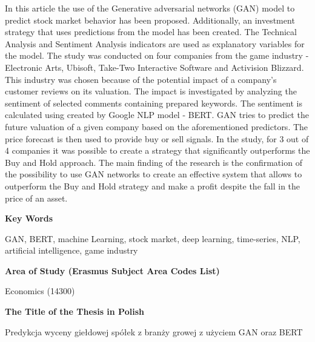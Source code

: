 \documentclass[11pt]{article} %
\begin{document}
\noindent In this article the use of the Generative adversarial networks (GAN) model to predict stock market behavior has been proposed. Additionally, an investment strategy that uses predictions from the model has been created. The Technical Analysis and Sentiment Analysis indicators are used as explanatory variables for the model. The study was conducted on four companies from the game industry -  Electronic Arts, Ubisoft, Take-Two Interactive Software and Activision Blizzard.  This industry was chosen because of the potential impact of a company's customer reviews on its valuation. The impact is investigated by analyzing the sentiment of selected comments containing prepared keywords. The sentiment is calculated using created by Google NLP model - BERT. GAN tries to predict the future valuation of a given company based on the aforementioned predictors. The price forecast is then used to provide buy or sell signals. In the study, for 3 out of 4 companies it was possible to create a strategy that significantly outperforms the Buy and Hold approach. The main finding of the research is the confirmation of the possibility to use GAN networks to create an effective system that allows to outperform the Buy and Hold strategy and make a profit despite the fall in the price of an asset.

\vspace{\baselineskip}

\begin{center}
\textbf{Key Words}

GAN, BERT, machine Learning, stock market, deep learning, time-series, NLP, artificial intelligence, game industry
\end{center}

\vspace{\baselineskip}

\begin{center}
\textbf{Area of Study (Erasmus Subject Area Codes List)}

Economics (14300)
\end{center}

\vspace{\baselineskip}

\begin{center}
\textbf{The Title of the Thesis in Polish}

Predykcja wyceny giełdowej spółek z branży growej z użyciem GAN oraz BERT
\end{center}

\pagebreak
\end{document}
